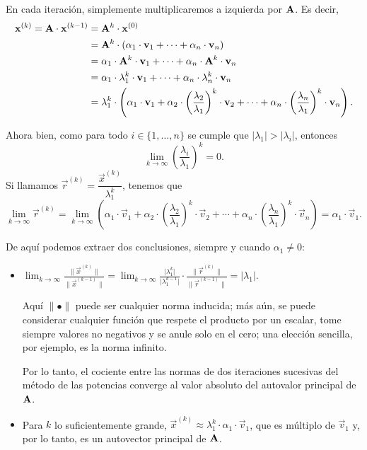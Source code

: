 En cada iteración, simplemente multiplicaremos a izquierda por $\mathbf{A}$.
Es decir,
\[ \begin{aligned}
    \mathbf{x}^{(k)} = \mathbf{A} \cdot \mathbf{x}^{(k-1)}
        &= \mathbf{A}^k \cdot \mathbf{x}^{(0)} \\
        &= \mathbf{A}^k \cdot \left( \alpha_1 \cdot \mathbf{v}_1
            + \cdots + \alpha_n \cdot \mathbf{v}_n \right) \\
        &= \alpha_1 \cdot \mathbf{A}^k \cdot \mathbf{v}_1
            + \cdots + \alpha_n \cdot \mathbf{A}^k \cdot \mathbf{v}_n \\
        &= \alpha_1 \cdot \lambda_1^k \cdot \mathbf{v}_1
            + \cdots + \alpha_n \cdot \lambda_n^k \cdot \mathbf{v}_n \\
        &= \lambda_1^k \cdot \left( \alpha_1 \cdot \mathbf{v}_1
            + \alpha_2 \cdot
                \left(\frac{\lambda_2}{\lambda_1}\right)^k \cdot \mathbf{v}_2
            + \cdots + \alpha_n \cdot
                \left(\frac{\lambda_n}{\lambda_1}\right)^k \cdot \mathbf{v}_n
            \right).
\end{aligned} \]

Ahora bien, como para todo $i \in \{1,\dots,n\}$ se cumple que
$\lvert \lambda_1 \rvert > \lvert \lambda_i \rvert$, entonces
\[ \lim_{k\to\infty} \left(\frac{\lambda_i}{\lambda_1}\right)^k = 0. \]
Si llamamos $\vec{r}^{(k)} = \dfrac{\vec{x}^{(k)}}{\lambda_1^k}$,
tenemos que
\[ \lim_{k\to\infty} \vec{r}^{(k)} =
    \lim_{k\to\infty} \left( \alpha_1 \cdot \vec{v}_1
        + \alpha_2 \cdot
            \left(\frac{\lambda_2}{\lambda_1}\right)^k \cdot \vec{v}_2
        + \cdots + \alpha_n \cdot
            \left(\frac{\lambda_n}{\lambda_1}\right)^k \cdot \vec{v}_n
        \right) = \alpha_1 \cdot \vec{v}_1. \]

De aquí podemos extraer dos conclusiones, siempre y cuando $\alpha_1 \neq 0$:
\begin{itemize}
\item $\displaystyle \lim_{k\to\infty}
        \frac{\lVert \vec{x}^{(k)} \rVert}
             {\lVert \vec{x}^{(k-1)} \rVert}
    = \lim_{k\to\infty}
        \frac{\lvert \lambda_1^k\rvert}{\lvert \lambda_1^{k-1}\rvert} \cdot
        \frac{\lVert \vec{r}^{(k)} \rVert}{\lVert \vec{r}^{(k-1)} \rVert}
    = \lvert \lambda_1 \rvert$.

    Aquí $\lVert \bullet \lVert$ puede ser cualquier norma inducida; más aún,
    se puede considerar cualquier función que respete el producto por un
    escalar, tome siempre valores no negativos y se anule solo en el cero;
    una elección sencilla, por ejemplo, es la norma infinito.

    Por lo tanto, el cociente entre las normas de dos iteraciones sucesivas
    del método de las potencias converge al valor absoluto del autovalor
    principal de $\mathbf{A}$.
\item Para $k$ lo suficientemente grande, $\vec{x}^{(k)} \approx \lambda_1^k
    \cdot \alpha_1 \cdot \vec{v}_1$, que es múltiplo de $\vec{v}_1$ y, por
    lo tanto, es un autovector principal de $\mathbf{A}$.
\end{itemize}

